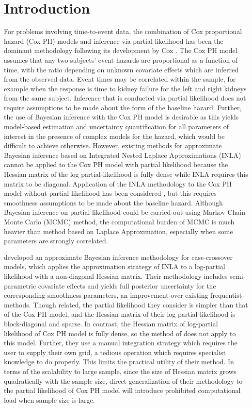 \documentclass[ba]{imsart}
\begin{document}
\section{Introduction}\label{sec1}
For problems involving time-to-event data, the combination of Cox proportional hazard (Cox PH) models and inference via partial likelihood has been the dominant methodology following its development by Cox \citep{coxph}. The Cox PH model assumes that any two subjects' event hazards are proportional as a function of time, with the ratio depending on unknown covariate effects which are inferred from the observed data. Event times may be correlated within the sample, for example when the response is time to kidney failure for the left and right kidneys from the same subject. Inference that is conducted via partial likelihood does not require assumptions to be made about the form of the baseline hazard. Further, the use of Bayesian inference with the Cox PH model is desirable as this yields model-based estimation and uncertainty quantification for all parameters of interest in the presence of complex models for the hazard, which would be difficult to achieve otherwise. However, existing methods for approximate Bayesian inference based on Integrated Nested Laplace Approximations (INLA) \citep{inla} cannot be applied to the Cox PH model with partial likelihood because the Hessian matrix of the log partial-likelihood is fully dense while INLA requires this matrix to be diagonal. Application of the INLA methodology to the Cox PH model without partial likelihood has been considered \citep{inlacoxph}, but this requires smoothness assumptions to be made about the baseline hazard. Although Bayesian inference on partial likelihood could be carried out using Markov Chain Monte Carlo (MCMC) method, the computational burden of MCMC is much heavier than method based on Laplace Approximation, especially when some parameters are strongly correlated.

\cite{casecross} developed an approximate Bayesian inference methodology for case-crossover models, which applies the approximation strategy of INLA to a log-partial likelihood with a non-diagonal Hessian matrix. Their methodology includes semi-parametric covariate effects and yields full posterior uncertainty for the corresponding smoothness parameters, an improvement over existing frequentist methods. Though related, the partial likelihood they consider is simpler than that of the Cox PH model, and the Hessian matrix of their log-partial likelihood is block-diagonal and sparse. In contrast, the Hessian matrix of log-partial likelihood of Cox PH model is fully dense, so the method of \cite{casecross} does not apply to this model. Further, they use a manual integration strategy which requires the user to supply their own grid, a tedious operation which requires specialist knowledge to do properly. This limits the practical utility of their method. In terms of the scalability to large sample, since the size of Hessian matrix grows quadratically with the sample size, direct generalization of their methodology to the partial likelihood of Cox PH model will introduce prohibited computational load when sample size is large.
\end{document}
